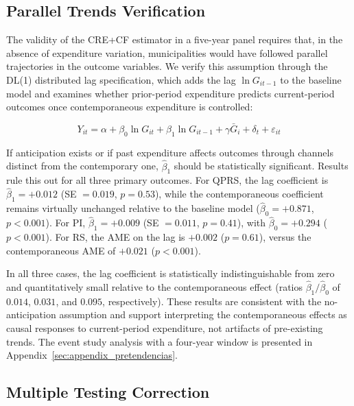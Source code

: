 \subsection{Parallel Trends Verification}
\label{sec:pretendencias}

The validity of the CRE+CF estimator in a five-year panel requires that, in the absence of expenditure variation, municipalities would have followed parallel trajectories in the outcome variables.
We verify this assumption through the DL(1) distributed lag specification, which adds the lag $\ln G_{it-1}$ to the baseline model and examines whether prior-period expenditure predicts current-period outcomes once contemporaneous expenditure is controlled:

\begin{equation}
  Y_{it} = \alpha + \beta_0 \ln G_{it} + \beta_1 \ln G_{it-1} + \gamma \bar{G}_{i} + \delta_{t} + \varepsilon_{it}
  \label{eq:dl1}
\end{equation}

If anticipation exists or if past expenditure affects outcomes through channels distinct from the contemporary one, $\hat{\beta}_1$ should be statistically significant.
Results rule this out for all three primary outcomes.
For QPRS, the lag coefficient is $\hat{\beta}_1 = +0.012$ (SE $= 0.019$, $p = 0.53$), while the contemporaneous coefficient remains virtually unchanged relative to the baseline model ($\hat{\beta}_0 = +0.871$, $p < 0.001$).
For PI, $\hat{\beta}_1 = +0.009$ (SE $= 0.011$, $p = 0.41$), with $\hat{\beta}_0 = +0.294$ ($p < 0.001$).
For RS, the AME on the lag is $+0.002$ ($p = 0.61$), versus the contemporaneous AME of $+0.021$ ($p < 0.001$).

In all three cases, the lag coefficient is statistically indistinguishable from zero and quantitatively small relative to the contemporaneous effect (ratios $\hat{\beta}_1/\hat{\beta}_0$ of $0.014$, $0.031$, and $0.095$, respectively).
These results are consistent with the no-anticipation assumption and support interpreting the contemporaneous effects as causal responses to current-period expenditure, not artifacts of pre-existing trends.
The event study analysis with a four-year window is presented in Appendix~\ref{sec:appendix_pretendencias}.

\subsection{Multiple Testing Correction}
\label{sec:multiplicidad}

